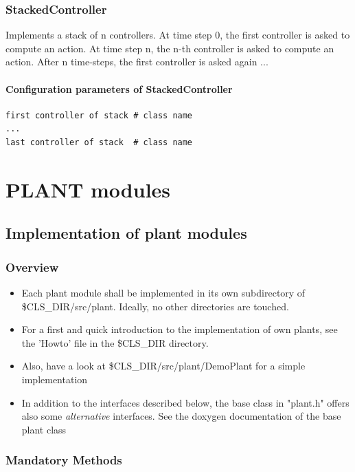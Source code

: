 \documentclass[a4paper,12pt,german]{article}
\newcommand{\clsdir}{{\$CLS\_DIR}}
\newcommand{\ite}{\begin{itemize}}
\newcommand{\eti}{\end{itemize}}
\begin{document}
\subsubsection{StackedController}
Implements a stack of n controllers. At time step 0, the first controller is asked to 
compute an action. At time step n, the n-th controller is asked to compute
an action. After n time-steps, the first controller is asked again ...

\paragraph{Configuration parameters of StackedController}

\begin{footnotesize}
\begin{verbatim}
first controller of stack # class name
...
last controller of stack  # class name 
\end{verbatim}
\end{footnotesize}


\section{PLANT modules}


\subsection{Implementation of plant modules}

\subsubsection{Overview}

\ite
\item Each plant module shall be implemented in its own subdirectory of \clsdir/src/plant.
Ideally, no other directories are touched.
\item For a first and quick introduction to the implementation of own plants, 
see the 'Howto' file in the \clsdir{ }  directory.
\item Also, have a look at \clsdir/src/plant/DemoPlant for a simple implementation
\item In addition to the interfaces described below, the base class in "plant.h" offers also
  some \emph{alternative} interfaces. See the doxygen documentation of the base plant class
\eti

\subsubsection{Mandatory Methods}
\end{document}
